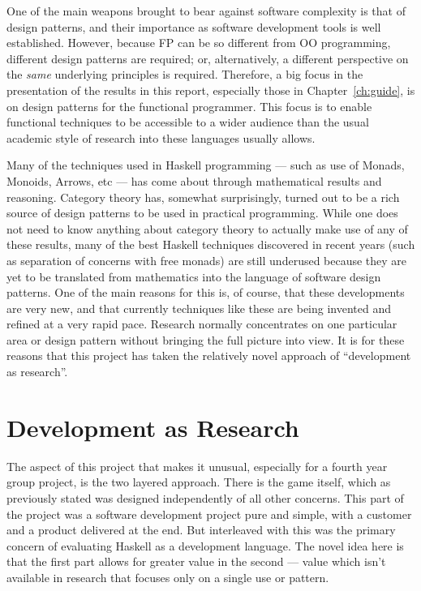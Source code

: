 One of the main weapons brought to bear against software complexity is that of design patterns, and their importance as software development tools is well established. However, because FP can be so different from OO programming, different design patterns are required; or, alternatively, a different perspective on the \emph{same} underlying principles is required. Therefore, a big focus in the presentation of the results in this report, especially those in Chapter~\ref{ch:guide}, is on design patterns for the functional programmer. This focus is to enable functional techniques to be accessible to a wider audience than the usual academic style of research into these languages usually allows.

Many of the techniques used in Haskell programming --- such as use of Monads, Monoids, Arrows, etc --- has come about through mathematical results and reasoning. Category theory has, somewhat surprisingly, turned out to be a rich source of design patterns to be used in practical programming. While one does not need to know anything about category theory to actually make use of any of these results, many of the best Haskell techniques discovered in recent years (such as separation of concerns with free monads) are still underused because they are yet to be translated from mathematics into the language of software design patterns. One of the main reasons for this is, of course, that these developments are very new, and that currently techniques like these are being invented and refined at a very rapid pace. Research normally concentrates on one particular area or design pattern without bringing the full picture into view. It is for these reasons that this project has taken the relatively novel approach of ``development as research''.

\section{Development as Research}

The aspect of this project that makes it unusual, especially for a fourth year group project, is the two layered approach. There is the game itself, which as previously stated was designed independently of all other concerns. This part of the project was a software development project pure and simple, with a customer and a product delivered at the end. But interleaved with this was the primary concern of evaluating Haskell as a development language. The novel idea here is that the first part allows for greater value in the second --- value which isn't available in research that focuses only on a single use or pattern. 


